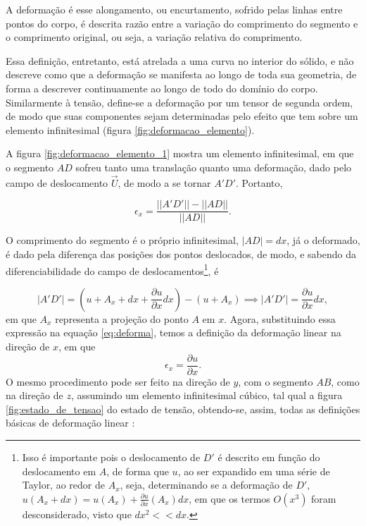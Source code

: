 A deformação é esse alongamento, ou encurtamento, sofrido pelas linhas entre pontos do corpo, é descrita razão entre a variação do comprimento do segmento e o comprimento original, ou seja, a variação relativa do comprimento.  

Essa definição, entretanto, está atrelada a uma curva no interior do sólido, e não descreve como que a deformação se manifesta ao longo de toda sua geometria, de forma a descrever continuamente ao longo de todo do domínio do corpo. Similarmente à tensão, define-se a deformação por um tensor de segunda ordem, de modo que suas componentes sejam determinadas pelo efeito que tem sobre um elemento infinitesimal (figura \ref{fig:deformacao_elemento}). \cite[pág. 230]{lub}

A figura \ref{fig:deformacao_elemento_1} mostra um elemento infinitesimal, em que o segmento $AD$ sofreu tanto uma translação quanto uma deformação, dado pelo campo de deslocamento $\vec{U}$, de modo a se tornar $A'D'$. Portanto,

\begin{equation}
    \epsilon_x = \frac{||A'D'|| - ||AD||}{||AD||}.
    \label{eq:deforma}
\end{equation}



O comprimento do segmento é o próprio infinitesimal, $|AD| = dx$, já o deformado, é dado pela diferença das posições dos pontos deslocados, de modo, e sabendo da diferenciabilidade do campo de deslocamentos\footnote{Isso é importante pois o deslocamento de $D'$ é descrito em função do deslocamento em $A$, de forma que $u$, ao ser expandido em uma série de Taylor, ao redor de $A_x$, seja, determinando se a deformação de $D'$, $u(A_x + dx) = u(A_x) + \frac{\partial u}{\partial x}(A_x) dx$, em que os termos $O(x^3)$ foram desconsiderado, visto que $dx^2 << dx$.}, é

\begin{equation}
    |A'D'| = (u + A_x + dx + \frac{\partial u}{\partial x} dx) - (u + A_x) \implies |A'D'| = \frac{\partial u}{\partial x} dx,
\end{equation}
em que $A_x$ representa a projeção do ponto $A$ em $x$.
Agora, substituindo essa expressão na equação \ref{eq:deforma}, temos a definição da deformação linear na direção de $x$, em que
\begin{equation}
    \epsilon_x = \frac{\partial u}{\partial x}.
\end{equation}
O mesmo procedimento pode ser feito na direção de $y$, com o segmento $AB$, como na direção de $z$, assumindo um elemento infinitesimal cúbico, tal qual a figura \ref{fig:estado_de_tensao} do estado de tensão, obtendo-se, assim, todas as definições básicas de deformação linear \cite{popov}:


